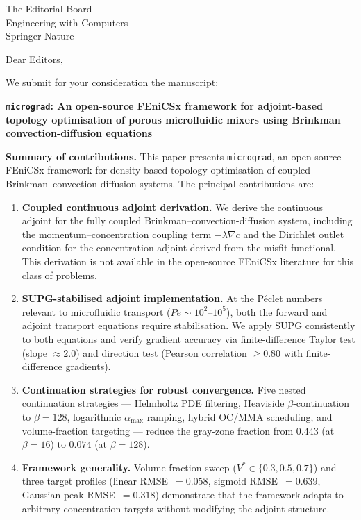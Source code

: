\documentclass[12pt,a4paper]{letter}
\date{\today}
\begin{document}
\begin{letter}{
    The Editorial Board\\
    Engineering with Computers\\
    Springer Nature
}

\opening{Dear Editors,}

We submit for your consideration the manuscript:

\begin{center}
\textbf{\texttt{micrograd}: An open-source FEniCSx framework for adjoint-based topology optimisation of porous microfluidic mixers using Brinkman--convection-diffusion equations}
\end{center}

\textbf{Summary of contributions.}
This paper presents \texttt{micrograd}, an open-source FEniCSx framework
for density-based topology optimisation of coupled
Brinkman--convection-diffusion systems.
The principal contributions are:

\begin{enumerate}
\item \textbf{Coupled continuous adjoint derivation.}
We derive the continuous adjoint for the fully coupled
Brinkman--convection-diffusion system, including the momentum--concentration
coupling term $-\lambda\nabla c$ and the Dirichlet outlet condition for the
concentration adjoint derived from the misfit functional.
This derivation is not available in the open-source FEniCSx literature for
this class of problems.

\item \textbf{SUPG-stabilised adjoint implementation.}
At the P\'{e}clet numbers relevant to microfluidic transport
($Pe \sim 10^2$--$10^5$), both the forward and adjoint transport equations
require stabilisation.
We apply SUPG consistently to both equations and verify gradient accuracy
via finite-difference Taylor test (slope $\approx 2.0$) and direction test
(Pearson correlation $\geq 0.80$ with finite-difference gradients).

\item \textbf{Continuation strategies for robust convergence.}
Five nested continuation strategies --- Helmholtz PDE filtering,
Heaviside $\beta$-continuation to $\beta=128$, logarithmic
$\alpha_{\max}$ ramping, hybrid OC/MMA scheduling, and volume-fraction
targeting --- reduce the gray-zone fraction from $0.443$ (at $\beta=16$)
to $0.074$ (at $\beta=128$).

\item \textbf{Framework generality.}
Volume-fraction sweep ($V^*\in\{0.3, 0.5, 0.7\}$) and three target
profiles (linear RMSE~$=0.058$, sigmoid RMSE~$=0.639$, Gaussian peak
RMSE~$=0.318$) demonstrate that the framework adapts to arbitrary
concentration targets without modifying the adjoint structure.


\end{enumerate}
\end{letter}
\end{document}
